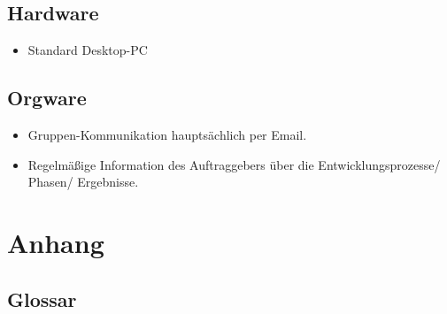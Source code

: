\documentclass[10pt]{report}
\begin{document}
\section{Hardware}
\begin{itemize}
\item Standard Desktop-PC
\end{itemize}

\section{Orgware}
\begin{itemize}
\item Gruppen-Kommunikation hauptsächlich per Email.
\item Regelmäßige Information des Auftraggebers über die Entwicklungsprozesse/ Phasen/ Ergebnisse.
\end{itemize}




\chapter{Anhang}
\section{Glossar}
\end{document}
